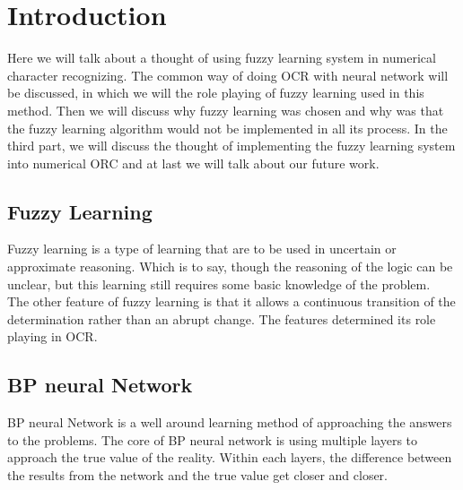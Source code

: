 \documentclass[12pt]{article} %
\begin{document}

\tableofcontents %


\newpage

\section{Introduction} %

Here we will talk about a thought of using fuzzy learning system in numerical character recognizing. The common way of doing OCR with neural network will be discussed, in which we will the role playing of fuzzy learning used in this method. Then we will discuss why fuzzy learning was chosen and why was that the fuzzy learning algorithm would not be implemented in all its process. In the third part, we will discuss the thought of implementing the fuzzy learning system into numerical ORC and at last we will talk about our future work.


\subsection{Fuzzy Learning} %

Fuzzy learning is a type of learning that are to be used in uncertain or approximate reasoning. Which is to say, though the reasoning of the logic can be unclear, but this learning still requires some basic knowledge of the problem. \\
The other feature of fuzzy learning is that it allows a continuous transition of the determination rather than an abrupt change.
The features determined its role playing in OCR.


\subsection{BP neural Network} %
BP neural Network is a well around learning method of approaching the answers to the problems. The core of BP neural network is using multiple layers to approach the true value of the reality. Within each layers, the difference between the results from the network and the true value get closer and closer.
\end{document}
